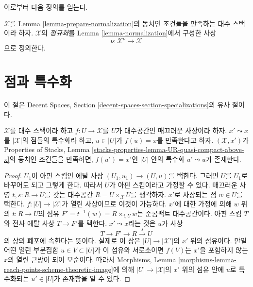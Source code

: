 \noindent
이로부터 다음 정의를 얻는다.

\begin{definition}
\label{definition-normalization}
$\mathcal{X}$를 Lemma \ref{lemma-prepare-normalization}의 동치인 조건들을
만족하는 대수 스택이라 하자. $\mathcal{X}$의 {\it 정규화}를 Lemma
\ref{lemma-normalization}에서 구성한 사상
$$
\nu : \mathcal{X}^\nu \longrightarrow \mathcal{X}
$$
으로 정의한다.
\end{definition}










\section{점과 특수화}
\label{section-specializations}

\noindent
이 절은 Decent Spaces, Section
\ref{decent-spaces-section-specializations}의 유사 절이다.

\begin{lemma}
\label{lemma-specialization}
$\mathcal{X}$를 대수 스택이라 하고 $f : U \to \mathcal{X}$를 $U$가
대수공간인 매끄러운 사상이라 하자. $x' \leadsto x$를
$|\mathcal{X}|$의 점들의 특수화라 하고, $u \in |U|$가 $f(u) = x$를
만족한다고 하자. $(\mathcal{X}, x')$가 Properties of Stacks, Lemma
\ref{stacks-properties-lemma-UR-quasi-compact-above-x}의 동치인 조건들을
만족하면, $f(u') = x'$인 $|U|$ 안의 특수화 $u' \leadsto u$가 존재한다.
\end{lemma}

\begin{proof}
$U_1$이 아핀 스킴인 에탈 사상 $(U_1, u_1) \to (U, u)$를 택한다.
그러면 $U$를 $U_1$로 바꾸어도 되고 그렇게 한다. 따라서 $U$가 아핀
스킴이라고 가정할 수 있다. 매끄러운 사영
$t, s : R \to U$를 갖는 대수공간
$R = U \times_\mathcal{X} U$를 생각하자. $x'$로 사상되는 점 $w \in U$를
택한다. $f : |U| \to |\mathcal{X}|$가 열린 사상이므로 이것이 가능하다.
$x'$에 대한 가정에 의해 $w$ 위의 $t : R \to U$의 섬유
$F' = t^{-1}(w) = R \times_{t, U} w$는 준콤팩트 대수공간이다. 아핀 스킴
$T$와 전사 에탈 사상 $T \to F'$를 택한다. $x' \leadsto x$라는 것은
$u$가 사상
$$
T \to F' \to R \xrightarrow{s} U
$$
의 상의 폐포에 속한다는 뜻이다. 실제로 이 상은
$|U| \to |\mathcal{X}'|$의 $x'$ 위의 섬유이다. 만일 어떤 열린 부분집합
$u \in V \subset |U|$가 이 섬유와 서로소이면 $f(V)$는 $x'$을 포함하지
않는 $x$의 열린 근방이 되어 모순이다. 따라서 Morphisms, Lemma
\ref{morphisms-lemma-reach-points-scheme-theoretic-image}에 의해
$|U| \to |\mathcal{X}|$의 $x'$ 위의 섬유 안에 $u$로 특수화되는
$u' \in |U|$가 존재함을 알 수 있다.
\end{proof}



